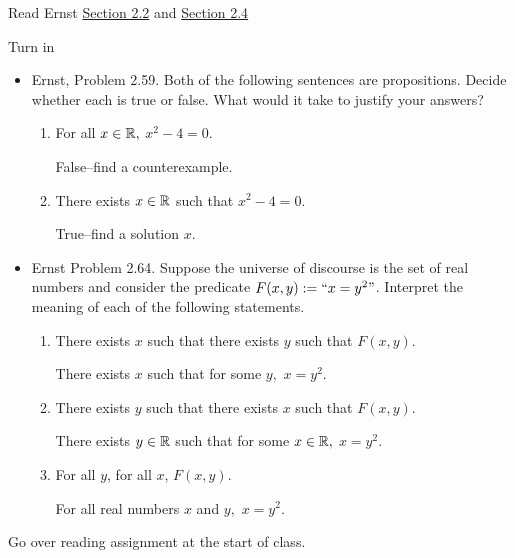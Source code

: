 \documentclass{ximera}
\begin{document}
\begin{pre}
 \item[Read] Ernst \href{https://danaernst.com/IBL-IntroToProof/pretext/sec_Intro_to_Logic.html}{Section 2.2} and \href{https://danaernst.com/IBL-IntroToProof/pretext/sec_Introduction_to_Quantification.html}{Section 2.4}
 
 \item[Turn in] 
 
\begin{itemize}
 
\item Ernst, Problem 2.59.
Both of the following sentences are propositions. Decide whether each is true or false. What would it take to justify your answers?
\begin{enumerate}%
 \item For all $x\in\mathbb R,$ $x^2-4=0$.
 
\begin{solution}
False--find a counterexample.
\end{solution}
 \item There exists $x\in\mathbb R$ such that $x^2-4=0$.
\begin{solution}
True--find a solution $x$.
\end{solution}
\end{enumerate}

\item  Ernst Problem 2.64.
 Suppose the universe of discourse is the set of real numbers and consider the predicate $F(x,y):=``x=y^2"$.
Interpret the meaning of each of the following statements.
\begin{enumerate}%
 \item There exists $x$ such that there exists $y$ such that $F(x,y)$.
\begin{solution}
There exists $x$ such that for some $y,$ $x=y^2.$ 
\end{solution}

 \item There exists $y$ such that there exists $x$ such that $F(x,y)$.
  
\begin{solution}
There exists $y\in\mathbb R$ such that for some $x\in\mathbb R,$ $x=y^2.$ 
\end{solution}

\item For all $y$, for all $x$, $F(x,y)$.
 
\begin{solution}
For all real numbers $x$ and $y,$ $x=y^2.$ 
\end{solution}
 \end{enumerate}

\end{itemize}
\end{pre}
Go over reading assignment at the start of class.
\end{document}
